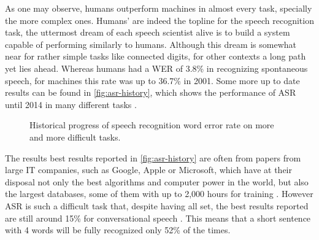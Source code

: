 As one may observe, humans outperform machines in almost every task, specially the more complex ones. 
Humans' are indeed the topline for the speech recognition task, the uttermost dream of each speech 
scientist alive is to build a system capable of performing similarly to humans. Although this dream is somewhat near
for rather simple tasks like connected digits, for other contexts a long path yet lies ahead. Whereas humans had a WER of 3.8\% in recognizing spontaneous speech, for machines this rate was up to 36.7\% in 2001. Some more up to date results can be found in \autoref{fig:asr-history}, which shows the performance of \ac{ASR} until 2014 in many different tasks \cite{Huang2014}. 

\begin{figure}[!ht]
        \noindent{}
        \caption{Historical progress of speech recognition word error rate on more and more
difficult tasks.}
        \label{fig:asr-history}
\end{figure}

The results best results reported in \autoref{fig:asr-history} are often from papers from large IT companies, such as Google, Apple or Microsoft, which have at their disposal not only the best algorithms and computer power in the world, but also the largest databases, some of them with up to 2,000 hours for training \cite{Huang2014}. However \ac{ASR} is such a difficult task that, despite having all set, the best results reported are still around 15\% for conversational speech  \cite{Huang2014}. This means that a short sentence with 4 words will be fully recognized only 52\% of the times. 

